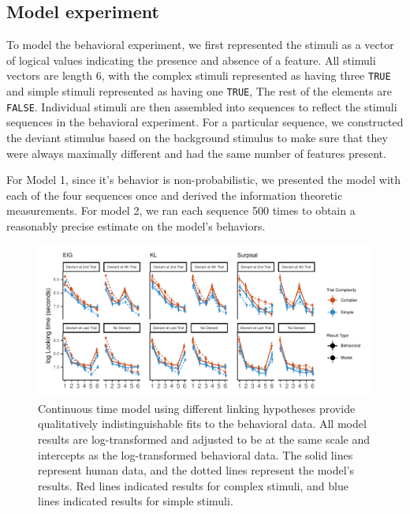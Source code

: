 \documentclass[10pt, letterpaper]{article}
\newenvironment{CodeChunk}{}{}
\begin{document}
\hypertarget{model-experiment}{%
\subsection{Model experiment}\label{model-experiment}}

To model the behavioral experiment, we first represented the stimuli as
a vector of logical values indicating the presence and absence of a
feature. All stimuli vectors are length 6, with the complex stimuli
represented as having three \texttt{TRUE} and simple stimuli represented
as having one \texttt{TRUE}, The rest of the elements are
\texttt{FALSE}. Individual stimuli are then assembled into sequences to
reflect the stimuli sequences in the behavioral experiment. For a
particular sequence, we constructed the deviant stimulus based on the
background stimulus to make sure that they were always maximally
different and had the same number of features present.

For Model 1, since it's behavior is non-probabilistic, we presented the
model with each of the four sequences once and derived the information
theoretic measurements. For model 2, we ran each sequence 500 times to
obtain a reasonably precise estimate on the model's behaviors.

\begin{CodeChunk}
\begin{figure}[h]

{\centering \includegraphics{figs/experiment_res-1} 

}

\caption[Continuous time model using different linking hypotheses provide qualitatively indistinguishable fits to the behavioral data]{Continuous time model using different linking hypotheses provide qualitatively indistinguishable fits to the behavioral data. All model results are log-transformed and adjusted to be at the same scale and intercepts as the log-transformed behavioral data. The solid lines represent human data, and the dotted lines represent the model's results. Red lines indicated results for complex stimuli, and blue lines indicated results for simple stimuli.}\label{fig:experiment_res}
\end{figure}
\end{CodeChunk}
\end{document}

